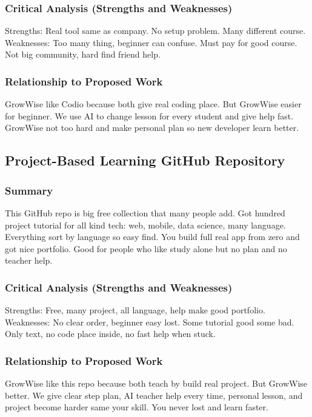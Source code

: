 \documentclass{FastFyp}
\begin{document}
\subsubsection{Critical Analysis (Strengths and Weaknesses)}
Strengths: Real tool same as company. No setup problem. Many different course.  
Weaknesses: Too many thing, beginner can confuse. Must pay for good course. Not big community, hard find friend help.

\subsubsection{Relationship to Proposed Work}
GrowWise like Codio because both give real coding place. But GrowWise easier for beginner. We use AI to change lesson for every student and give help fast. GrowWise not too hard and make personal plan so new developer learn better.


\subsection{Project-Based Learning GitHub Repository}

\subsubsection{Summary}
This GitHub repo \cite{ref:GitHubProjectBasedLearning} is big free collection that many people add. Got hundred project tutorial for all kind tech: web, mobile, data science, many language. Everything sort by language so easy find. You build full real app from zero and got nice portfolio. Good for people who like study alone but no plan and no teacher help.

\subsubsection{Critical Analysis (Strengths and Weaknesses)}
Strengths: Free, many project, all language, help make good portfolio.  
Weaknesses: No clear order, beginner easy lost. Some tutorial good some bad. Only text, no code place inside, no fast help when stuck.

\subsubsection{Relationship to Proposed Work}
GrowWise like this repo because both teach by build real project. But GrowWise better. We give clear step plan, AI teacher help every time, personal lesson, and project become harder same your skill. You never lost and learn faster.
\end{document}
